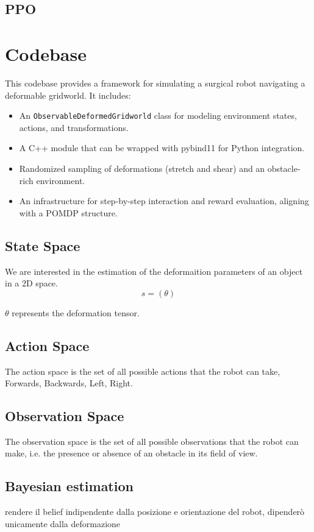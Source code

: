 \documentclass[12pt,a4paper]{article}
\begin{document}
\subsection{PPO}


\newpage
\section{Codebase}
This codebase provides a framework for simulating a surgical robot navigating a deformable gridworld. It includes:
\begin{itemize}
    \item An \texttt{ObservableDeformedGridworld} class for modeling environment states, actions, and transformations.
    \item A C++ module that can be wrapped with pybind11 for Python integration.
    \item Randomized sampling of deformations (stretch and shear) and an obstacle-rich environment.
    \item An infrastructure for step-by-step interaction and reward evaluation, aligning with a POMDP structure.
\end{itemize}
\subsection{State Space}
We are interested in the estimation of the deformaition parameters of an object in a 2D space.
$$s = (\theta)$$

$\theta$ represents the deformation tensor.

\subsection{Action Space}
The action space is the set of all possible actions that the robot can take, 
Forwards, Backwards, Left, Right.
\subsection{Observation Space}
The observation space is the set of all possible observations that the robot can make,
i.e. the presence or absence of an obstacle in its field of view.
\subsection{Bayesian estimation}

rendere il belief indipendente dalla posizione e orientazione del robot, dipenderò unicamente dalla deformazione
\end{document}
